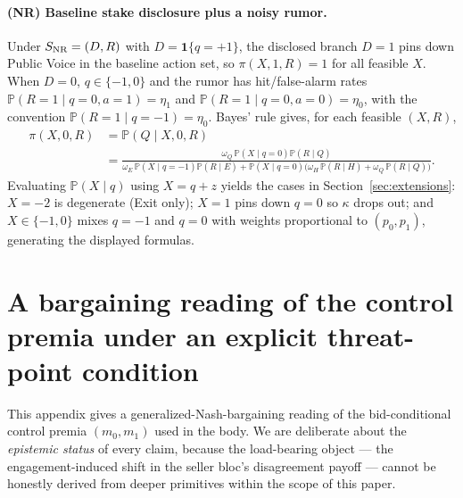 \documentclass[11pt]{article}
\newcommand{\PP}{\mathbb{P}}
\newcommand{\1}{\mathbf{1}}
\begin{document}
\paragraph{(NR) Baseline stake disclosure plus a noisy rumor.}
Under $S_{\textup{NR}}=(D,R)$ with $D=\1\{q=+1\}$, the disclosed branch $D=1$ pins down Public Voice in the baseline action set, so $\pi(X,1,R)=1$ for all feasible $X$.
When $D=0$, $q\in\{-1,0\}$ and the rumor has hit/false-alarm rates $\PP(R=1 \mid q=0,a=1)=\eta_1$ and $\PP(R=1 \mid q=0,a=0)=\eta_0$, with the convention $\PP(R=1 \mid q=-1)=\eta_0$.
Bayes' rule gives, for each feasible $(X,R)$,
\begin{align*}
\pi(X,0,R)
&=\PP(Q \mid X,0,R)\\
&=\frac{\omega_Q\,\PP(X \mid q=0)\PP(R \mid Q)}
{\omega_E\,\PP(X \mid q=-1)\PP(R \mid E)+\PP(X \mid q=0)\big(\omega_H\,\PP(R \mid H)+\omega_Q\,\PP(R \mid Q)\big)}.
\end{align*}
Evaluating $\PP(X \mid q)$ using $X=q+z$ yields the cases in Section~\ref{sec:extensions}: $X=-2$ is degenerate (Exit only); $X=1$ pins down $q=0$ so $\kappa$ drops out; and $X\in\{-1,0\}$ mixes $q=-1$ and $q=0$ with weights proportional to $(p_0,p_1)$, generating the displayed formulas.


\providecommand{\Dtil}{\widetilde{\Delta}}
\providecommand{\mtil}{\widetilde{m}}
\providecommand{\mR}{m^{R}}
\makeatletter
{}
\makeatother

\section{A bargaining reading of the control premia under an explicit threat-point condition}
\label{app:bg}

This appendix gives a generalized-Nash-bargaining reading of the bid-conditional control premia $(m_{0},m_{1})$ used in the body. We are deliberate about the \emph{epistemic status} of every claim, because the load-bearing object --- the engagement-induced shift in the seller bloc's disagreement payoff --- cannot be honestly derived from deeper primitives within the scope of this paper.
\end{document}

